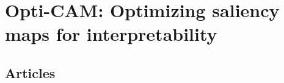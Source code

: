 \chapter{Opti-CAM: Optimizing saliency maps for interpretability}
\chaptertoc{}

\section{Articles}

